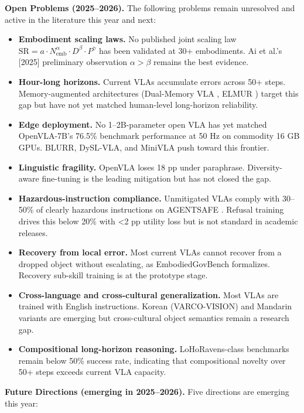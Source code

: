 \documentclass{article}
\begin{document}
\textbf{Open Problems (2025--2026).} The following problems remain unresolved and active in the literature this year and next:

\begin{itemize}

\item
  \textbf{Embodiment scaling laws.} No published joint scaling law \(\text{SR} = a \cdot N_{\text{emb}}^{\alpha} \cdot D^{\beta} \cdot P^{\gamma}\) has been validated at 30+ embodiments. Ai et al.'s {[}2025{]} preliminary observation \(\alpha > \beta\) remains the best evidence.
\item
  \textbf{Hour-long horizons.} Current VLAs accumulate errors across 50+ steps. Memory-augmented architectures (Dual-Memory VLA \cite{li2026globalpriormeetslo}, ELMUR \cite{cherepanov2025elmurexternallayer}) target this gap but have not yet matched human-level long-horizon reliability.
\item
  \textbf{Edge deployment.} No 1--2B-parameter open VLA has yet matched OpenVLA-7B's 76.5\% benchmark performance at 50 Hz on commodity 16 GB GPUs. BLURR, DySL-VLA, and MiniVLA push toward this frontier.
\item
  \textbf{Linguistic fragility.} OpenVLA loses 18 pp under paraphrase. Diversity-aware fine-tuning is the leading mitigation but has not closed the gap.
\item
  \textbf{Hazardous-instruction compliance.} Unmitigated VLAs comply with 30--50\% of clearly hazardous instructions on AGENTSAFE \cite{ying2025agentsafebenchmark}. Refusal training drives this below 20\% with \textless2 pp utility loss but is not standard in academic releases.
\item
  \textbf{Recovery from local error.} Most current VLAs cannot recover from a dropped object without escalating, as EmbodiedGovBench \cite{qin2026embodiedgovbenchab} formalizes. Recovery sub-skill training is at the prototype stage.
\item
  \textbf{Cross-language and cross-cultural generalization.} Most VLAs are trained with English instructions. Korean (VARCO-VISION) and Mandarin variants are emerging but cross-cultural object semantics remain a research gap.
\item
  \textbf{Compositional long-horizon reasoning.} LoHoRavens-class benchmarks remain below 50\% success rate, indicating that compositional novelty over 50+ steps exceeds current VLA capacity.
\end{itemize}

\textbf{Future Directions (emerging in 2025--2026).} Five directions are emerging this year:
\end{document}
